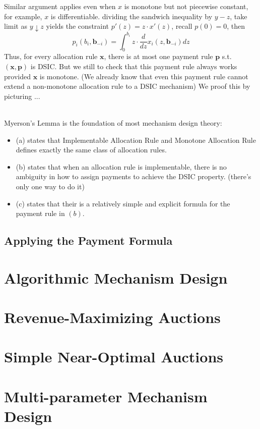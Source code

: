 \documentclass[10pt]{article}
\theoremstyle{definition}
\begin{document}
Similar argument applies even when $x$ is monotone but not piecewise constant, for example, $x$ is differentiable. dividing the sandwich inequality by $y-z$,
take limit as $y \downarrow z$ yields the constraint $p'(z) = z \cdot x'(z)$, recall $p(0) = 0$, then
\begin{equation*}
	p_{i}(b_{i}, \textbf{b}_{-i}) = \int_{0}^{b_{i}}z \cdot \frac{d}{dz}x_{i}(z, \textbf{b}_{-i})dz
\end{equation*}
Thus, for every allocation rule $\textbf{x}$, there is at most one payment rule $\textbf{p}$ s.t. $(\textbf{x}, \textbf{p})$ is DSIC.
But we still to check that this payment rule always works provided $\textbf{x}$ is monotone.
(We already know that even this payment rule cannot extend a non-monotone allocation rule to a DSIC mechanism)
We proof this by picturing ...
\qedhere

\text{}\\
Myerson's Lemma is the foundation of most mechanism design theory:
\begin{itemize}
	\item (a) states that Implementable Allocation Rule and Monotone Allocation Rule defines exactly the same class of allocation rules.
	\item (b) states that when an allocation rule is implementable, there is no ambiguity in how to assign payments to achieve the DSIC property.
	      (there's only one way to do it)
	\item (c) states that their is a relatively simple and explicit formula for the payment rule in $(b)$.
\end{itemize}

\subsection{Applying the Payment Formula}

\section{Algorithmic Mechanism Design}

\section{Revenue-Maximizing Auctions}

\section{Simple Near-Optimal Auctions}

\section{Multi-parameter Mechanism Design}
\end{document}
